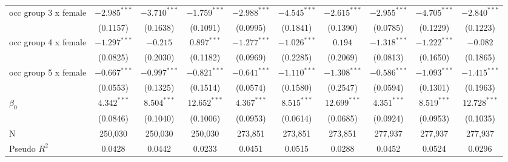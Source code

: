 \begin{tabular}{l|ccc|ccc|ccc}
occ group 3 x female       &          $-2.985^{***}$ &  $-3.710^{***}$ &  $-1.759^{***}$ &           $-2.988^{***}$ &  $-4.545^{***}$ &  $-2.615^{***}$ &           $-2.955^{***}$ &  $-4.705^{***}$ &  $-2.840^{***}$ \\
                           &                (0.1157) &        (0.1638) &        (0.1091) &                 (0.0995) &        (0.1841) &        (0.1390) &                 (0.0785) &        (0.1229) &        (0.1223) \\
occ group 4 x female       &          $-1.297^{***}$ &        $-0.215$ &   $0.897^{***}$ &           $-1.277^{***}$ &  $-1.026^{***}$ &         $0.194$ &           $-1.318^{***}$ &  $-1.222^{***}$ &        $-0.082$ \\
                           &                (0.0825) &        (0.2030) &        (0.1182) &                 (0.0969) &        (0.2285) &        (0.2069) &                 (0.0813) &        (0.1650) &        (0.1865) \\
occ group 5 x female       &          $-0.667^{***}$ &  $-0.997^{***}$ &  $-0.821^{***}$ &           $-0.641^{***}$ &  $-1.110^{***}$ &  $-1.308^{***}$ &           $-0.586^{***}$ &  $-1.093^{***}$ &  $-1.415^{***}$ \\
                           &                (0.0553) &        (0.1325) &        (0.1514) &                 (0.0574) &        (0.1580) &        (0.2547) &                 (0.0594) &        (0.1301) &        (0.1963) \\
$\beta_0$                  &           $4.342^{***}$ &   $8.504^{***}$ &  $12.652^{***}$ &            $4.367^{***}$ &   $8.515^{***}$ &  $12.699^{***}$ &            $4.351^{***}$ &   $8.519^{***}$ &  $12.728^{***}$ \\
                           &                (0.0846) &        (0.1040) &        (0.1006) &                 (0.0953) &        (0.0614) &        (0.0685) &                 (0.0924) &        (0.0953) &        (0.1035) \\
N                          &                 250,030 &         250,030 &         250,030 &                  273,851 &         273,851 &         273,851 &                  277,937 &         277,937 &         277,937 \\
Pseudo $R^2$               &                  0.0428 &          0.0442 &          0.0233 &                   0.0451 &          0.0515 &          0.0288 &                   0.0452 &          0.0524 &          0.0296 \\
\bottomrule
\end{tabular}
